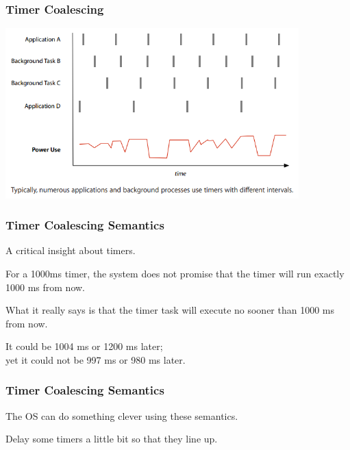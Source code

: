 \begin{frame}
\frametitle{Timer Coalescing}
\begin{center}
	\includegraphics[width=0.85\textwidth]{images/coalesced_before.png}
\end{center}

\end{frame}

\begin{frame}
\frametitle{Timer Coalescing Semantics}
\begin{changemargin}{1cm}

A critical insight about timers. 

For a 1000ms timer, the system does not promise that the timer will run exactly 1000 ms from now. 

What it really says is that the timer task will execute \alert{no sooner than} 1000 ms from now. 

It could be 1004 ms or 1200 ms later;\\
\quad yet it could not be 997 ms or 980 ms later.


\end{changemargin}
\end{frame}

\begin{frame}
\frametitle{Timer Coalescing Semantics}
\begin{changemargin}{1cm}

The OS can do something clever using these semantics.

Delay some timers a little bit so that they line up.

\end{changemargin}
\end{frame}

